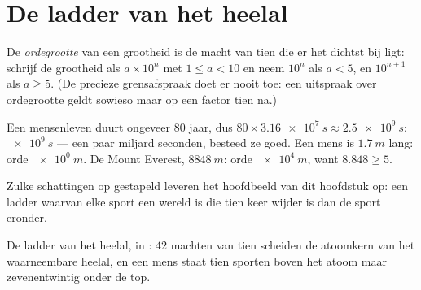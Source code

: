 \section{De ladder van het heelal}

\begin{definition}[Ordegrootte]\label{def:g10:orders-of-magnitude:oom}
De \emph{ordegrootte} van een grootheid is de macht
van tien die er het dichtst bij ligt: schrijf de grootheid als
$a \times 10^{n}$ met $1 \leq a < 10$ en neem $10^{n}$ als $a < 5$,
en $10^{n+1}$ als $a \geq 5$. (De precieze grensafspraak doet er nooit
toe: een uitspraak over ordegrootte geldt sowieso maar op een factor
tien na.)
\end{definition}

\begin{example}[Ordegrootten]\label{ex:g10:orders-of-magnitude:oom}
Een mensenleven duurt ongeveer $80$ jaar, dus
$80 \times \qty{3.16e7}{s} \approx \qty{2.5e9}{s}$: 
$\qty{e9}{s}$ --- een paar miljard seconden, besteed ze goed. Een mens
is $\qty{1.7}{m}$ lang: orde $\qty{e0}{m}$. De Mount Everest,
$\qty{8848}{m}$: orde $\qty{e4}{m}$, want $8.848 \geq 5$.
\end{example}

Zulke schattingen op  gestapeld leveren het hoofdbeeld van dit
hoofdstuk op: een ladder waarvan elke sport een wereld is die tien keer
wijder is dan de sport eronder.

\begin{omfigure}

{\small De ladder van het heelal, in : $42$ machten van tien
scheiden de atoomkern van het waarneembare heelal, en een mens staat
tien sporten boven het atoom maar zevenentwintig onder de top.}
\end{omfigure}

